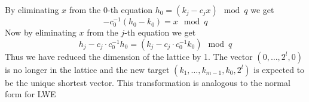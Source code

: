By eliminating $x$ from the $0$-th equation $h_0 = (k_j - c_jx) \mod{q}$ we get
\begin{equation*}
    -c_0^{-1}(h_0 - k_0) = x \mod{q}
\end{equation*}
Now by eliminating $x$ from the $j$-th equation we get
\begin{equation*}
    h_j - c_j \cdot c_0^{-1}h_0 = (k_j - c_j \cdot c_0^{-1}k_0) \mod{q}
\end{equation*}
Thus we have reduced the dimension of the lattice by 1. The vector $(0,\ldots, 2^l, 0)$ is no longer in the lattice and the new target $(k_1, \ldots, k_{m-1}, k_0, 2^l)$ is expected to be the unique shortest vector. This transformation is analogous to the normal form for LWE